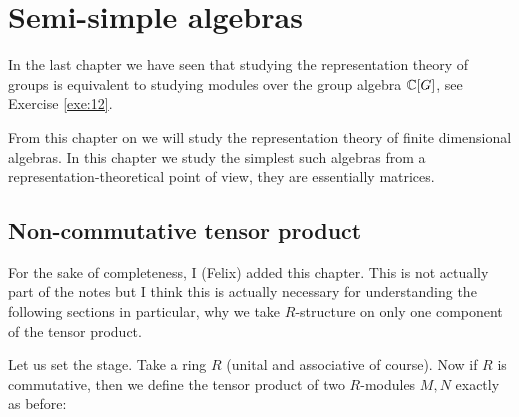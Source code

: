\documentclass[twoside = false,	%
		headsepline,		%
		parskip = true,
		]{scrbook}						%
\begin{document}
\chapter{Semi-simple algebras}
    In the last chapter we have seen that studying the representation theory of groups is equivalent to studying modules over the group algebra $\mathbb C[G]$, see Exercise \ref{exe:12}.

    From this chapter on we will study the representation theory of finite dimensional algebras. In this chapter we study the simplest such algebras from a representation-theoretical point of view, they are essentially matrices.
\setcounter{section}{-1}
\section{Non-commutative tensor product}\label{non-commTP}
    For the sake of completeness, I (Felix) added this chapter. This is not actually part of the notes but I think this is actually necessary for understanding the following sections in particular, why we take $R$-structure on only one component of the tensor product.

    Let us set the stage. Take a ring $R$ (unital and associative of course). Now if $R$ is commutative, then we define the tensor product of two $R$-modules $M,N$ exactly as before:
    
\end{document}
